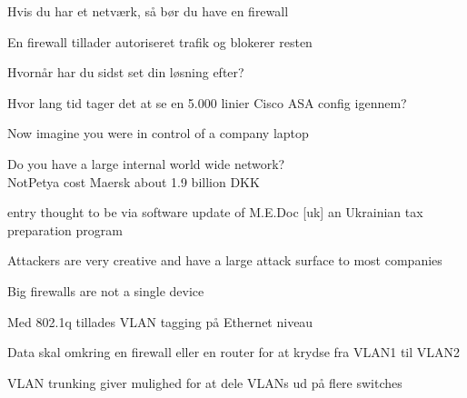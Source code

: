 \documentclass[Screen16to9,17pt]{foils}
\begin{document}
\begin{list2}
\item Hvis du har et netværk, så bør du have en firewall
\item En firewall tillader autoriseret trafik og blokerer resten
\item Hvornår har du sidst set din løsning efter?
\item Hvor lang tid tager det at se en 5.000 linier Cisco ASA config igennem?
\end{list2}



\begin{list2}
\item Now imagine you were in control of a company laptop
\item Do you have a large internal world wide network?\\
NotPetya cost Maersk about 1.9 billion DKK

\item entry thought to be via software update of M.E.Doc [uk] an Ukrainian tax preparation program
\item Attackers are very creative and have a large attack surface to most companies
\end{list2}



\centerline{Big firewalls are not a single device}





\begin{list1}
\item Med 802.1q tillades VLAN tagging på Ethernet niveau
\item Data skal omkring en firewall eller en router for at krydse fra VLAN1 til VLAN2
\item VLAN trunking giver mulighed for at dele VLANs ud på flere switches
\end{list1}
\end{document}
